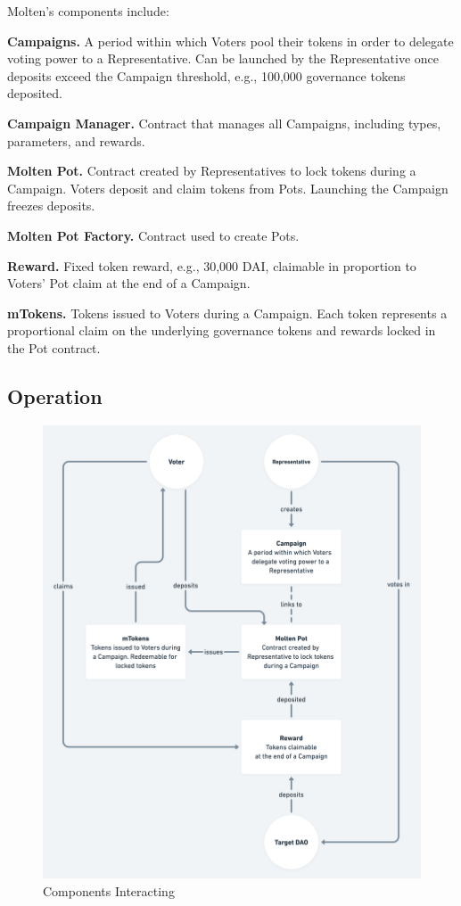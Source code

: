 \documentclass[
]{article}
\begin{document}
Molten's components include:

\textbf{Campaigns.} A period within which Voters pool their tokens in
order to delegate voting power to a Representative. Can be launched by
the Representative once deposits exceed the Campaign threshold, e.g.,
100,000 governance tokens deposited.

\textbf{Campaign Manager.} Contract that manages all Campaigns,
including types, parameters, and rewards.

\textbf{Molten Pot.} Contract created by Representatives to lock tokens
during a Campaign. Voters deposit and claim tokens from Pots. Launching
the Campaign freezes deposits.

\textbf{Molten Pot Factory.} Contract used to create Pots.

\textbf{Reward.} Fixed token reward, e.g., 30,000 DAI, claimable in
proportion to Voters' Pot claim at the end of a Campaign.

\textbf{mTokens.} Tokens issued to Voters during a Campaign. Each token
represents a proportional claim on the underlying governance tokens and
rewards locked in the Pot contract.

\hypertarget{operation}{%
\subsection{Operation}\label{operation}}

\begin{figure}
\centering
\includegraphics[width=\textwidth]{./img/molten_interactions.png}
\caption{Components Interacting}
\end{figure}
\end{document}
